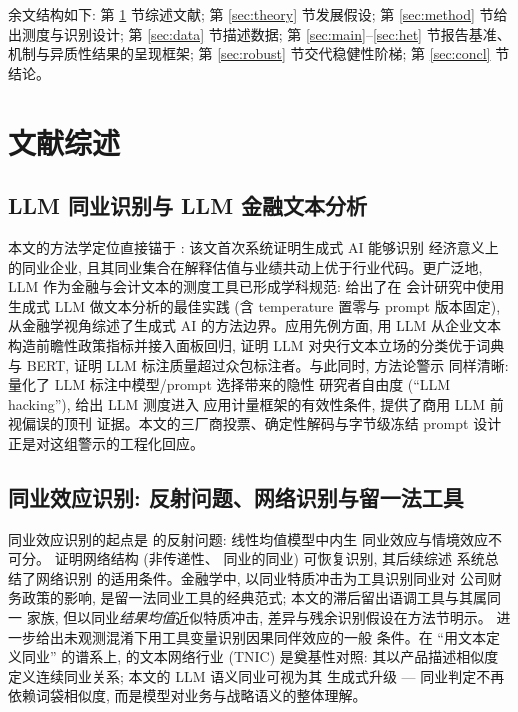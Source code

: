 余文结构如下: 第 \ref{sec:lit} 节综述文献; 第 \ref{sec:theory} 节发展假设;
第 \ref{sec:method} 节给出测度与识别设计; 第 \ref{sec:data} 节描述数据;
第 \ref{sec:main}--\ref{sec:het} 节报告基准、机制与异质性结果的呈现框架;
第 \ref{sec:robust} 节交代稳健性阶梯; 第 \ref{sec:concl} 节结论。

\section{文献综述}\label{sec:lit}

\subsection{LLM 同业识别与 LLM 金融文本分析}
本文的方法学定位直接锚于 \textcite{cao2025genai}: 该文首次系统证明生成式 AI 能够识别
经济意义上的同业企业, 且其同业集合在解释估值与业绩共动上优于行业代码。更广泛地,
LLM 作为金融与会计文本的测度工具已形成学科规范: \textcite{dekok2025chatgpt} 给出了在
会计研究中使用生成式 LLM 做文本分析的最佳实践 (含 temperature 置零与 prompt 版本固定),
\textcite{eisfeldt2025genai} 从金融学视角综述了生成式 AI 的方法边界。应用先例方面,
\textcite{jha2024chatgpt} 用 LLM 从企业文本构造前瞻性政策指标并接入面板回归,
\textcite{hansen2023fedspeak} 证明 LLM 对央行文本立场的分类优于词典与 BERT,
\textcite{gilardi2023chatgpt} 证明 LLM 标注质量超过众包标注者。与此同时, 方法论警示
同样清晰: \textcite{baumann2025llmhacking} 量化了 LLM 标注中模型/prompt 选择带来的隐性
研究者自由度 (``LLM hacking''), \textcite{ludwig2025llmframework} 给出 LLM 测度进入
应用计量框架的有效性条件, \textcite{levy2026lookahead} 提供了商用 LLM 前视偏误的顶刊
证据。本文的三厂商投票、确定性解码与字节级冻结 prompt 设计正是对这组警示的工程化回应。

\subsection{同业效应识别: 反射问题、网络识别与留一法工具}
同业效应识别的起点是 \textcite{manski1993reflection} 的反射问题: 线性均值模型中内生
同业效应与情境效应不可分。\textcite{bramoulle2009networks} 证明网络结构 (非传递性、
同业的同业) 可恢复识别, 其后续综述 \parencite{bramoulle2020survey} 系统总结了网络识别
的适用条件。金融学中, \textcite{leary2014peerfirms} 以同业特质冲击为工具识别同业对
公司财务政策的影响, 是留一法同业工具的经典范式; 本文的滞后留出语调工具与其属同一
家族, 但以同业\emph{结果均值}近似特质冲击, 差异与残余识别假设在方法节明示。
\textcite{luo2025causalpeer} 进一步给出未观测混淆下用工具变量识别因果同伴效应的一般
条件。在 ``用文本定义同业'' 的谱系上, \textcite{hoberg2016textnetwork} 的文本网络行业
(TNIC) 是奠基性对照: 其以产品描述相似度定义连续同业关系; 本文的 LLM 语义同业可视为其
生成式升级 --- 同业判定不再依赖词袋相似度, 而是模型对业务与战略语义的整体理解。

